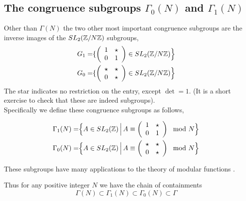 \subsection{The congruence subgroups $\Gamma_0(N)$ and $\Gamma_1(N)$}

Other than $\Gamma(N)$ the two other most important congruence subgroups are the inverse images of the $SL_2(\mathbb{Z}/N\mathbb{Z})$ subgroups,
\begin{align*}
G_1 = &  \lbrace \left(\begin{array}{ c c } 1 & \star \\ 0 & 1 \end{array} \right) \in SL_2(\mathbb{Z}/N\mathbb{Z}) \Big  \rbrace \\
G_0 = &  \lbrace \left(\begin{array}{ c c } \star & \star \\ 0 & \star \end{array} \right) \in SL_2(\mathbb{Z}/N\mathbb{Z}) \Big  \rbrace
\end{align*}
The star indicates no restriction on the entry, except $\det =1$. (It is a short exercise to check that these are indeed subgroups).\\
Specifically we define these congruence subgroups as follows,
\begin{definition}
\begin{align}
\Gamma_1(N)  = & \Big  \lbrace  A \in SL_2(\mathbb{Z})  \, \Big \vert \, A \equiv \left(\begin{array}{ c c } 1 & \star \\ 0 & 1 \end{array} \right) \mod N \Big  \rbrace \\
\Gamma_0(N)  = &  \Big  \lbrace  A \in SL_2(\mathbb{Z})  \, \Big \vert \, A \equiv \left(\begin{array}{ c c } \star & \star \\ 0 & \star \end{array} \right) \mod N \Big  \rbrace
\end{align}
\end{definition}
These subgroups have many applications to the theory of modular functions \citep{koblitz}. 

Thus for any positive integer $N$ we have the chain of containments 
$$\Gamma(N) \subset \Gamma_1(N) \subset \Gamma_0(N) \subset \Gamma$$


